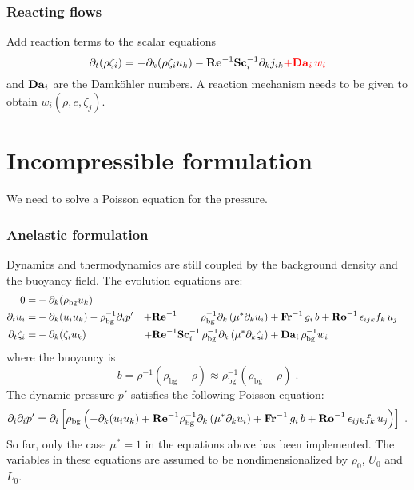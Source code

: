 \subsubsection{Reacting flows}

Add reaction terms to the scalar equations
\begin{equation}
    \partial_t (\rho \zeta_i)= -\partial_k (\rho \zeta_i u_k)
    - \mathrm{\bf Re}^{-1}\mathrm{\bf Sc}_i^{-1} \partial_k j_{ik} \color{red}{+\mathrm{\bf Da}_i\,w_i}
\end{equation}
and $\mathrm{\bf Da}_i$ are the Damk{\"o}hler numbers. A reaction mechanism needs to be given to obtain $w_i(\rho,e,\zeta_j)$.

\section{Incompressible formulation}

We need to solve a Poisson equation for the pressure.

\subsubsection{Anelastic formulation}

Dynamics and thermodynamics are still coupled by the background density and the buoyancy field. The evolution equations are:
\begin{subequations}
    \begin{align}
        0                 =& -\partial_k(\rho_\mathrm{bg}u_k)   & \\
        \partial_t  u_i   =& -\partial_k ( u_i u_k )-\rho_\mathrm{bg}^{-1}\partial_i p' &
        +\mathrm{\bf Re}^{-1}\qquad\;\rho_\mathrm{bg}^{-1}\partial_k \left( \mu^{*} \partial_k u_i\right) & +\mathrm{\bf Fr}^{-1}\, g_i\,b+\mathrm{\bf Ro}^{-1}\,\epsilon_{ijk} f_k\,u_j  \\
        \partial_t\zeta_i =& -\partial_k (\zeta_i u_k) &
        + \mathrm{\bf Re}^{-1}\mathrm{\bf Sc}_i^{-1}\, \rho_\mathrm{bg}^{-1}\partial_k \left( \mu^{*}\partial_k\zeta_i\right) &+ \mathrm{\bf Da}_i\,\rho_\mathrm{bg}^{-1}w_i
    \end{align}
\end{subequations}
where the buoyancy is
\begin{equation}
    b=\rho^{-1}(\rho_\mathrm{bg}-\rho)\approx\rho_\mathrm{bg}^{-1}(\rho_\mathrm{bg}-\rho) \;.
\end{equation}
The dynamic pressure $p'$ satisfies the following Poisson equation:
\begin{equation}
    \partial_i\partial_ip'=\partial_i\left[\rho_\mathrm{bg}\left(
    -\partial_k ( u_i u_k )+\mathrm{\bf Re}^{-1}\rho_\mathrm{bg}^{-1}\partial_k \left( \mu^{*} \partial_k u_i\right) +\mathrm{\bf Fr}^{-1}\, g_i\,b+\mathrm{\bf Ro}^{-1}\,\epsilon_{ijk} f_k\,u_j
    \right)\right]\;.
\end{equation}
So far, only the case $\mu^*=1$ in the equations above has been implemented. The variables in these equations are assumed to be nondimensionalized by $\rho_0$, $U_0$ and $L_0$.

